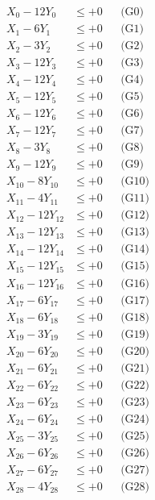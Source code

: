 \documentclass[a4paper,10pt]{article}
\begin{document}
\allowdisplaybreaks
{\small
\begin{align}
\allowbreak
\allowbreak
\allowbreak
X_{0} - 12Y_{0} &\leq +0 && \text{(G0)} \\
X_{1} - 6Y_{1} &\leq +0 && \text{(G1)} \\
X_{2} - 3Y_{2} &\leq +0 && \text{(G2)} \\
X_{3} - 12Y_{3} &\leq +0 && \text{(G3)} \\
X_{4} - 12Y_{4} &\leq +0 && \text{(G4)} \\
X_{5} - 12Y_{5} &\leq +0 && \text{(G5)} \\
\allowbreak
X_{6} - 12Y_{6} &\leq +0 && \text{(G6)} \\
X_{7} - 12Y_{7} &\leq +0 && \text{(G7)} \\
X_{8} - 3Y_{8} &\leq +0 && \text{(G8)} \\
X_{9} - 12Y_{9} &\leq +0 && \text{(G9)} \\
X_{10} - 8Y_{10} &\leq +0 && \text{(G10)} \\
X_{11} - 4Y_{11} &\leq +0 && \text{(G11)} \\
X_{12} - 12Y_{12} &\leq +0 && \text{(G12)} \\
X_{13} - 12Y_{13} &\leq +0 && \text{(G13)} \\
X_{14} - 12Y_{14} &\leq +0 && \text{(G14)} \\
X_{15} - 12Y_{15} &\leq +0 && \text{(G15)} \\
\allowbreak
X_{16} - 12Y_{16} &\leq +0 && \text{(G16)} \\
X_{17} - 6Y_{17} &\leq +0 && \text{(G17)} \\
X_{18} - 6Y_{18} &\leq +0 && \text{(G18)} \\
X_{19} - 3Y_{19} &\leq +0 && \text{(G19)} \\
X_{20} - 6Y_{20} &\leq +0 && \text{(G20)} \\
X_{21} - 6Y_{21} &\leq +0 && \text{(G21)} \\
X_{22} - 6Y_{22} &\leq +0 && \text{(G22)} \\
X_{23} - 6Y_{23} &\leq +0 && \text{(G23)} \\
X_{24} - 6Y_{24} &\leq +0 && \text{(G24)} \\
X_{25} - 3Y_{25} &\leq +0 && \text{(G25)} \\
\allowbreak
X_{26} - 6Y_{26} &\leq +0 && \text{(G26)} \\
X_{27} - 6Y_{27} &\leq +0 && \text{(G27)} \\
X_{28} - 4Y_{28} &\leq +0 && \text{(G28)} \\

\end{align}}
\end{document}
